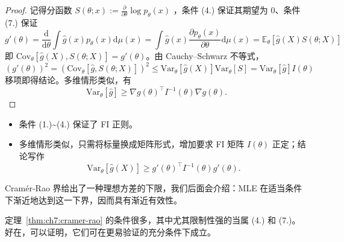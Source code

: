 \begin{proof}

记得分函数 $S(\theta; x) := \frac{\partial}{\partial\theta} \log p_\theta(x)$ ，条件 (4.) 保证其期望为 0、条件 (7.) 保证
\[g'(\theta) = \frac{\mathrm d}{\mathrm d\theta} \int \widehat{g}(x) p_\theta(x) \mathrm d\mu(x) = \int \widehat{g}(x) \frac{\partial p_\theta(x)}{\partial\theta} \mathrm d\mu(x)= \mathbb{E}_\theta[\widehat{g}(X) S(\theta; X)]\]
即 $\mathrm{Cov}_\theta[\widehat{g}(X), S(\theta; X)] = g'(\theta)$。由 Cauchy--Schwarz 不等式，
\[(g'(\theta))^2 = \left(\mathrm{Cov}_\theta[\widehat{g}, S(\theta;X)]\right)^2 \leq \mathrm{Var}_\theta[\widehat{g}(X)]  \mathrm{Var}_\theta[S] = \mathrm{Var}_\theta[\widehat{g}]  I(\theta)\]
移项即得结论。多维情形类似，有
\[
\mathrm{Var}_\theta[\widehat{g}]
\ge \nabla g(\theta)^\top I^{-1}(\theta)\nabla g(\theta).
\]

\end{proof}

\begin{remark}

\begin{itemize}
\tightlist
\item
  条件 (1.)\textasciitilde(4.) 保证了 FI 正则。
\item
  多维情形类似，只需将标量换成矩阵形式，增加要求 FI 矩阵 $I(\theta)$ 正定；结论写作
  \[
  \mathrm{Var}_\theta[\widehat g(X)]
  \ge g'(\theta)^\top I^{-1}(\theta)g'(\theta).
  \]
\end{itemize}
\end{remark}

Cramér‑Rao 界给出了一种理想方差的下限，我们后面会介绍：MLE 在适当条件下渐近地达到这一下界，因而具有渐近有效性。

定理~\ref{thm:ch7:cramer-rao} 的条件很多，其中尤其限制性强的当属 (4.) 和 (7.)。好在，可以证明，它们可在更易验证的充分条件下成立。

